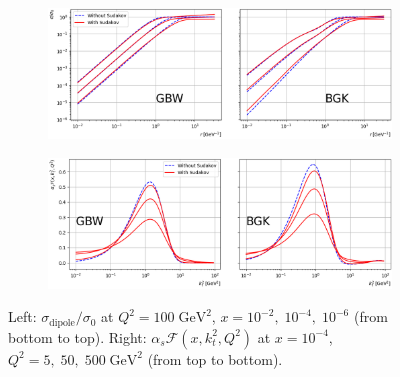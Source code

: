 \documentclass{appolb}
\begin{document}
\begin{figure}[t]
	\begin{subfigure}{0.49\textwidth}
		\centering
		\includegraphics[width=\textwidth]{./dipole.png}
		\caption{%
		}
		\label{fig:dipole}
	\end{subfigure}
	\begin{subfigure}{0.49\textwidth}
		\includegraphics[width=\textwidth]{./gluon.png}
		\caption{%
		}
		\label{fig:gluon}
	\end{subfigure}
	\caption{Left: $\sigma_{\mathrm{dipole}}/\sigma_0$ at $Q^2=100\;\mathrm{GeV^2}$, $x=10^{-2},\;10^{-4},\; 10^{-6}$ (from bottom to top). Right: $\alpha_s\mathcal{F}(x,k_t^2,Q^2)$ at $x=10^{-4}$, $Q^2=5, \;50 ,\; 500\; \mathrm{GeV^2}$ (from top to bottom).
	}
\end{figure}
\end{document}
